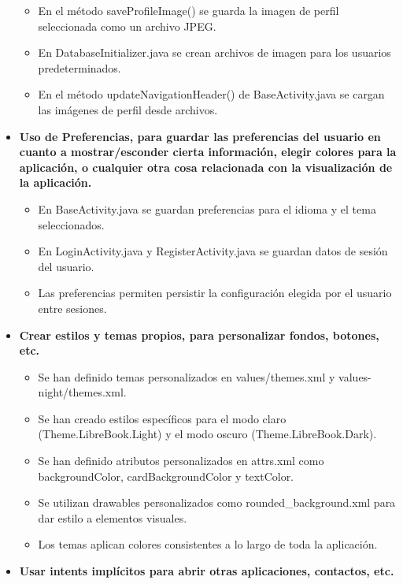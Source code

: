 \documentclass[a4paper,12pt]{report}
\begin{document}
\begin{itemize}
\begin{itemize}
          \item En el método saveProfileImage() se guarda la imagen de perfil seleccionada como un archivo JPEG.
          \item En DatabaseInitializer.java se crean archivos de imagen para los usuarios predeterminados.
          \item En el método updateNavigationHeader() de BaseActivity.java se cargan las imágenes de perfil desde archivos.
        \end{itemize}
        \item \textbf{Uso de Preferencias, para guardar las preferencias del usuario en cuanto a mostrar/esconder cierta información, elegir colores para la aplicación, o cualquier otra cosa relacionada con la visualización de la aplicación.}
        \begin{itemize}
          \item En BaseActivity.java se guardan preferencias para el idioma y el tema seleccionados.
          \item En LoginActivity.java y RegisterActivity.java se guardan datos de sesión del usuario.
          \item Las preferencias permiten persistir la configuración elegida por el usuario entre sesiones.
        \end{itemize}
        \item \textbf{Crear estilos y temas propios, para personalizar fondos, botones, etc.}
        \begin{itemize}
          \item Se han definido temas personalizados en values/themes.xml y values-night/themes.xml\cite{androidUIUX}.
          \item Se han creado estilos específicos para el modo claro (Theme.LibreBook.Light) y el modo oscuro (Theme.LibreBook.Dark).
          \item Se han definido atributos personalizados en attrs.xml como backgroundColor, cardBackgroundColor y textColor.
          \item Se utilizan drawables personalizados como rounded\_background.xml para dar estilo a elementos visuales.
          \item Los temas aplican colores consistentes a lo largo de toda la aplicación.
        \end{itemize}
        \item \textbf{Usar intents implícitos para abrir otras aplicaciones, contactos, etc.}
        \begin{itemize}

\end{itemize}
\end{itemize}
\end{document}
